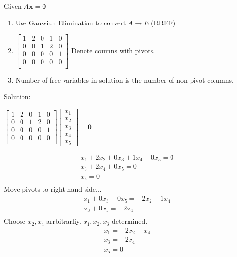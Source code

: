 \let \vec \mathbf
\begin{example} 
	Given $A\vec x =\vec 0$	
	\begin{enumerate} 
		\item Use Gaussian Elimination to convert $A\rightarrow E$ (RREF)
		\item 	$\begin{bmatrix} 
		1 &2 &0 &1 &0 \\
		0 &0 &1 &2 &0 \\
		0 &0 &0 &0 &1 \\
		0 &0 &0 &0 &0 \\
		\end{bmatrix}$
		Denote coumns with pivots. 
		\item Number of free variables in solution is the number of non-pivot columns.
	\end{enumerate}
	Solution:

	$\begin{bmatrix} 
		1 &2 &0 &1 &0 \\
		0 &0 &1 &2 &0 \\
		0 &0 &0 &0 &1 \\
		0 &0 &0 &0 &0 \\
		\end{bmatrix}
		\begin{bmatrix} 
			x_1 \\ x_2 \\ x_3 \\ x_4\\x_5
		\end{bmatrix} = \vec 0
		$
	
	\begin{align*} 
		x_1 + 2x_2 +  0x_3 +  1x_4 +  0x_5 = 0 \\
		x_3 +  2x_4 +  0x_5 = 0 \\
		x_5 = 0 \\
	\end{align*}
	Move pivots to right hand side...
	\begin{align*} 
		x_1 + 0x_3 +0x_5 =-2x_2 + 1x_4\\
		x_3 +  0x_5 =  -2x_4 \\
	\end{align*}
	Choose $x_2,x_4$ arrbitrarliy. $x_1,x_2,x_3$ determined.
	\begin{align} 
		x_1=-2x_2-x_4\\
		x_3=-2x_4 \\
		x_5=0
	\end{align}
\end{example}

